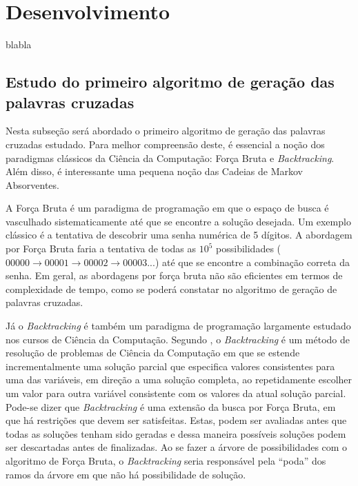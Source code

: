 \section{Desenvolvimento}
blabla

\subsection{Estudo do primeiro algoritmo de geração das palavras cruzadas} 
Nesta subseção será abordado o primeiro algoritmo de geração das palavras cruzadas estudado. Para melhor compreensão deste, é essencial a noção dos paradigmas clássicos da Ciência da Computação: Força Bruta e \textit{Backtracking}. Além disso, é interessante uma pequena noção das Cadeias de Markov Absorventes.

A Força Bruta é um paradigma de programação em que o espaço de busca é vasculhado sistematicamente até que se encontre a solução desejada. Um exemplo clássico é a tentativa de descobrir uma senha numérica de 5 dígitos. A abordagem por Força Bruta faria a tentativa de todas as $10^{5}$ possibilidades ($00000 \rightarrow 00001 \rightarrow 00002 \rightarrow 00003$...) até que se encontre a combinação correta da senha. Em geral, as abordagens por força bruta não são eficientes em termos de complexidade de tempo, como se poderá constatar no algoritmo de geração de palavras cruzadas.

Já o \textit{Backtracking} é também um paradigma de programação largamente estudado nos cursos de Ciência da Computação. Segundo \cite{nilsson1980principles}, o \textit{Backtracking} é um método de resolução de problemas de Ciência da Computação em que se estende incrementalmente uma solução parcial que especifica valores consistentes para uma das variáveis, em direção a uma solução completa, ao repetidamente escolher um valor para outra variável consistente com os valores da atual solução parcial. Pode-se dizer que \textit{Backtracking} é uma extensão da busca por Força Bruta, em que há restrições que devem ser satisfeitas. Estas, podem ser avaliadas antes que todas as soluções tenham sido geradas e dessa maneira possíveis soluções podem ser descartadas antes de finalizadas. Ao se fazer a árvore de possibilidades com o algoritmo de Força Bruta, o \textit{Backtracking} seria responsável pela ``poda'' dos ramos da árvore em que não há possibilidade de solução.


